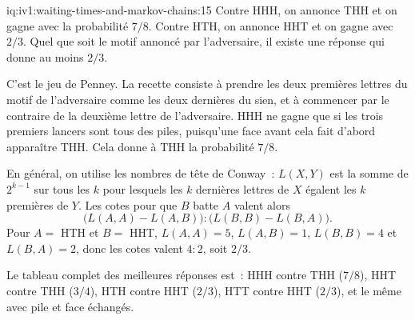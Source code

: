 \begin{solution}{iq:iv1:waiting-times-and-markov-chains:15}
Contre HHH, on annonce THH et on gagne avec la probabilité $7/8$. Contre HTH, on annonce HHT et on gagne avec $2/3$. Quel que soit le motif annoncé par l'adversaire, il existe une réponse qui donne au moins $2/3$.

C'est le jeu de Penney. La recette consiste à prendre les deux premières lettres du motif de l'adversaire comme les deux dernières du sien, et à commencer par le contraire de la deuxième lettre de l'adversaire. HHH ne gagne que si les trois premiers lancers sont tous des piles, puisqu'une face avant cela fait d'abord apparaître THH. Cela donne à THH la probabilité $7/8$.

En général, on utilise les nombres de tête de Conway~: $L(X, Y)$ est la somme de $2^{k-1}$ sur tous les $k$ pour lesquels les $k$ dernières lettres de $X$ égalent les $k$ premières de $Y$. Les cotes pour que $B$ batte $A$ valent alors
\[
\bigl(L(A, A) - L(A, B)\bigr) : \bigl(L(B, B) - L(B, A)\bigr).
\]
Pour $A = $ HTH et $B = $ HHT, $L(A, A) = 5$, $L(A, B) = 1$, $L(B, B) = 4$ et $L(B, A) = 2$, donc les cotes valent $4:2$, soit $2/3$.

Le tableau complet des meilleures réponses est~: HHH contre THH ($7/8$), HHT contre THH ($3/4$), HTH contre HHT ($2/3$), HTT contre HHT ($2/3$), et le même avec pile et face échangés.

\end{solution}

